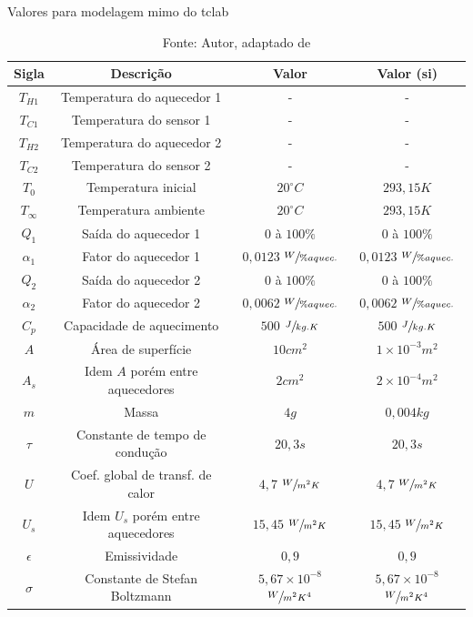 \begin{table}[h]
	\centering
	\caption{Valores para modelagem \acrshort{mimo} do \acrshort{tclab}}
	\label{tab:tclab_modelo_mimo_valores}
	\begin{tabular}{cccc} \toprule
		{Sigla} 		& {Descrição} 							& {Valor} 											& {Valor (\acrshort{si})} 							\\ \midrule
		$T_{H1}$ 		& Temperatura do aquecedor 1			& - 												& -													\\
		$T_{C1}$ 		& Temperatura do sensor 1				& - 												& -													\\
		$T_{H2}$ 		& Temperatura do aquecedor 2			& - 												& -													\\
		$T_{C2}$ 		& Temperatura do sensor 2				& - 												& -													\\
		$T_{0}$ 		& Temperatura inicial 					& $20^\circ C$ 										& $293{,}15 K $										\\
		$T_{\infty}$	& Temperatura ambiente					& $20^\circ C$										& $293{,}15 K $										\\
		$Q_1$			& Saída do aquecedor 1					& $0$ à $100\%$										& $0$ à $100\%$										\\
		$\alpha_1$		& Fator do aquecedor 1					& $0{,}0123$ $\sfrac{W}{\% aquec.}$				& $0{,}0123$ $\sfrac{W}{\% aquec.}$						\\
		$Q_2$			& Saída do aquecedor 2					& $0$ à $100\%$										& $0$ à $100\%$										\\
		$\alpha_2$		& Fator do aquecedor 2					& $0{,}0062$ $\sfrac{W}{\% aquec.}$				& $0{,}0062$ $\sfrac{W}{\% aquec.}$						\\
		$C_p$			& Capacidade de aquecimento				& $500$ $\sfrac{J}{kg.K}$							& $500$ $\sfrac{J}{kg.K}$							\\
		$A$				& Área de superfície					& $10 cm^{2}$										& $1{\times}10^{-3} m^{2}$							\\
		$A_s$			& Idem $A$ porém entre aquecedores		& $2 cm^{2}$										& $2{\times}10^{-4} m^{2}$							\\
		$m$				& Massa									& $4 g$												& $0{,}004 kg	$									\\
		$\tau$			& Constante de tempo de condução		& $20{,}3 s$										& $20{,}3 s$										\\
		$U$				& Coef. global de transf. de calor		& $4{,}7$ $\sfrac{W}{m^{2}K}$						& $4{,}7$ $\sfrac{W}{m^{2}K}$						\\
		$U_s$			& Idem $U_s$ porém entre aquecedores	& $15{,}45$ $\sfrac{W}{m^{2}K}$						& $15{,}45$ $\sfrac{W}{m^{2}K}$						\\
		$\epsilon$		& Emissividade							& $0{,}9$											& $0{,}9$											\\
		$\sigma$		& Constante de Stefan Boltzmann			& $5{,}67{\times}10^{-8}$ $\sfrac{W}{m^{2}K^{4}}$	& $5{,}67{\times}10^{-8}$ $\sfrac{W}{m^{2}K^{4}}$	\\ \bottomrule
	\end{tabular}
	\caption*{Fonte: Autor, adaptado de }
\end{table}

